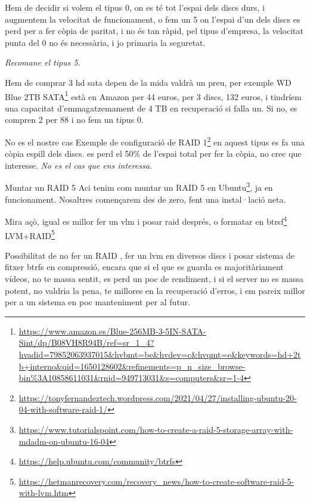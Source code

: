 \documentclass[
  10pt,
]{krantz}
\DeclareRobustCommand{\href}[2]{#2\footnote{\url{#1}}}
\begin{document}
Hem de decidir si volem el tipus 0, on es té tot l'espai dels discs durs, i augmentem la velocitat de funcionament, o fem un 5 on l'espai d'un dels discs es perd per a fer còpia de paritat, i no és tan ràpid, pel tipus d'empresa, la velocitat punta del 0 no és necessària, i jo primaria la seguretat.

\emph{Recomane el tipus 5.}

Hem de comprar 3 hd sata depen de la mida valdrà un preu, per exemple \href{https://www.amazon.es/Blue-256MB-3-5IN-SATA-Sint/dp/B08VH8R94B/ref=sr_1_4?hvadid=79852063937015\&hvbmt=be\&hvdev=c\&hvqmt=e\&keywords=hd+2tb+interno\&qid=1650128602\&refinements=p_n_size_browse-bin\%3A10858611031\&rnid=949713031\&s=computers\&sr=1-4}{WD Blue 2TB SATA} està en Amazon per 44 euros, per 3 discs, 132 euros, i tindríem una capacitat d'emmagatzemament de 4 TB en recuperació si falla un. Si no, es compren 2 per 88 i no fem un tipus 0.

\begin{rmdnote}{No es el nostre cas}
Exemple de configuració de \href{https://tonyfernandeztech.wordpress.com/2021/04/27/installing-ubuntu-20-04-with-software-raid-1/}{RAID 1} en aquest tipus es fa una còpia espill dels discs. es perd el 50\% de l'espai total per fer la còpia, no crec que interesse. \emph{No es el cas que ens interessa.}

\end{rmdnote}

\begin{rmdinfo}{Muntar un RAID 5}
Aci tenim com muntar un \href{https://www.tutorialspoint.com/how-to-create-a-raid-5-storage-array-with-mdadm-on-ubuntu-16-04}{RAID 5 en Ubuntu}, ja en funcionament. Nosaltres començarem des de zero, fent una instal·lació neta.

\end{rmdinfo}

Mira açò, igual es millor fer un vlm i posar raid després, o formatar en \href{https://help.ubuntu.com/community/btrfs}{btrsf} \href{https://hetmanrecovery.com/recovery_news/how-to-create-software-raid-5-with-lvm.htm}{LVM+RAID}

Possibilitat de no fer un RAID , fer un lvm en diversos discs i posar sistema de fitxer btrfs en compressió, encara que si el que es guarda es majoritàriament vídeos, no te massa sentit, es perd un poc de rendiment, i si el server no es massa potent, no valdria la pena, te millores en la recuperació d'erros, i em pareix millor per a un sistema en poc manteniment per al futur.
\end{document}
